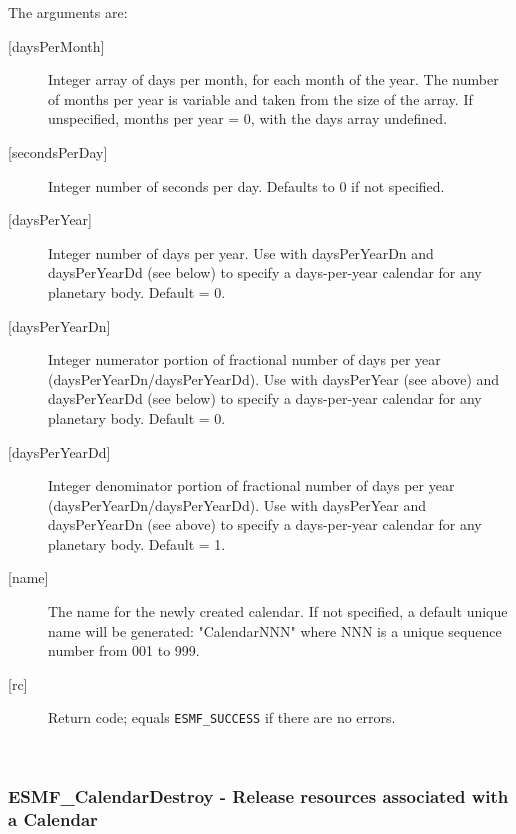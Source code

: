        The arguments are:
       \begin{description}
       \item[{[daysPerMonth]}]
            Integer array of days per month, for each month of the year.
            The number of months per year is variable and taken from the
            size of the array.  If unspecified, months per year = 0,
            with the days array undefined.
       \item[{[secondsPerDay]}]
            Integer number of seconds per day.  Defaults to 0 if not 
            specified.
       \item[{[daysPerYear]}]
            Integer number of days per year.  Use with daysPerYearDn and
            daysPerYearDd (see below) to specify a days-per-year calendar
            for any planetary body.  Default = 0.
       \item[{[daysPerYearDn]}]
            \begin{sloppypar}
            Integer numerator portion of fractional number of days per year
            (daysPerYearDn/daysPerYearDd).
            Use with daysPerYear (see above) and daysPerYearDd (see below) to
            specify a days-per-year calendar for any planetary body.
            Default = 0.
            \end{sloppypar}
       \item[{[daysPerYearDd]}]
            Integer denominator portion of fractional number of days per year
            (daysPerYearDn/daysPerYearDd).
            Use with daysPerYear and daysPerYearDn (see above) to
            specify a days-per-year calendar for any planetary body.
            Default = 1.
       \item[{[name]}]
            The name for the newly created calendar.  If not specified, a
            default unique name will be generated: "CalendarNNN" where NNN
            is a unique sequence number from 001 to 999.
       \item[{[rc]}]
            Return code; equals {\tt ESMF\_SUCCESS} if there are no errors.
       \end{description}
        
 
\mbox{}\hrulefill\ 
 
\subsubsection [ESMF\_CalendarDestroy] {ESMF\_CalendarDestroy - Release resources associated with a Calendar}


